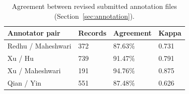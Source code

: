 \begin{table}[htbp]\centering
\caption{Agreement between revised submitted annotation files (Section~\ref{sec:annotation}).}\label{tab:agreement}
\begin{tabularx}{\linewidth}{YYYY}\toprule
Annotator pair & Records & Agreement & Kappa\\\midrule
Redhu / Maheshwari & 372 & 87.63\% & 0.731\\
Xu / Hu & 739 & 91.47\% & 0.791\\
Xu / Maheshwari & 191 & 94.76\% & 0.875\\
Qian / Yin & 551 & 87.48\% & 0.626\\\bottomrule\end{tabularx}\end{table}
